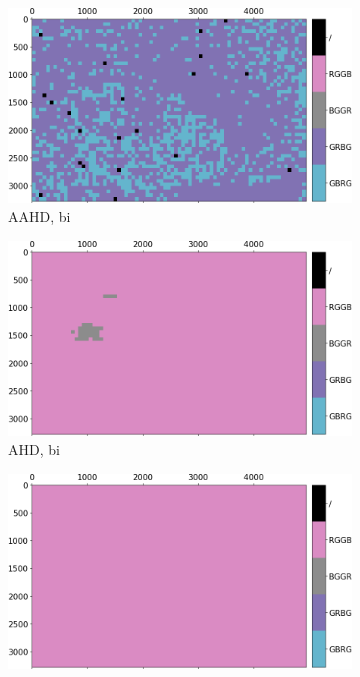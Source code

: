 \documentclass{ipol}
\begin{document}
\begin{figure}[ht]
\begin{subfigure}[c]{.14\linewidth}
\includegraphics[width=\linewidth]{images/bike/AAHD/bid_64_grids.png}
\caption{AAHD, bi}
\end{subfigure}%
\begin{subfigure}[c]{.14\linewidth}
\includegraphics[width=\linewidth]{images/bike/AHD/bid_64_grids.png}
\caption{AHD, bi}
\end{subfigure}%
\begin{subfigure}[c]{.14\linewidth}
\includegraphics[width=\linewidth]{images/bike/DCB/bid_64_grids.png}

\end{subfigure}
\end{figure}
\end{document}
